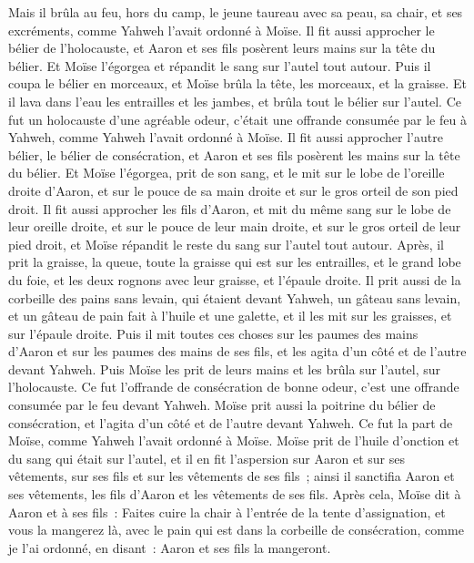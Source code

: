 \begin{multicols}{2}
Mais il brûla au feu, hors du camp, le jeune taureau avec sa peau, sa chair, et ses excréments, comme Yahweh l'avait ordonné à Moïse.
Il fit aussi approcher le bélier de l'holocauste, et Aaron et ses fils posèrent leurs mains sur la tête du bélier.
Et Moïse l'égorgea et répandit le sang sur l'autel tout autour.
Puis il coupa le bélier en morceaux, et Moïse brûla la tête, les morceaux, et la graisse.
Et il lava dans l'eau les entrailles et les jambes, et brûla tout le bélier sur l'autel. Ce fut un holocauste d'une agréable odeur, c'était une offrande consumée par le feu à Yahweh, comme Yahweh l'avait ordonné à Moïse.
Il fit aussi approcher l'autre bélier, le bélier de consécration, et Aaron et ses fils posèrent les mains sur la tête du bélier.
Et Moïse l'égorgea, prit de son sang, et le mit sur le lobe de l'oreille droite d'Aaron, et sur le pouce de sa main droite et sur le gros orteil de son pied droit.
Il fit aussi approcher les fils d'Aaron, et mit du même sang sur le lobe de leur oreille droite, et sur le pouce de leur main droite, et sur le gros orteil de leur pied droit, et Moïse répandit le reste du sang sur l'autel tout autour.
Après, il prit la graisse, la queue, toute la graisse qui est sur les entrailles, et le grand lobe du foie, et les deux rognons avec leur graisse, et l'épaule droite.
Il prit aussi de la corbeille des pains sans levain, qui étaient devant Yahweh, un gâteau sans levain, et un gâteau de pain fait à l'huile et une galette, et il les mit sur les graisses, et sur l'épaule droite.
Puis il mit toutes ces choses sur les paumes des mains d'Aaron et sur les paumes des mains de ses fils, et les agita d'un côté et de l'autre devant Yahweh.
Puis Moïse les prit de leurs mains et les brûla sur l'autel, sur l'holocauste. Ce fut l'offrande de consécration de bonne odeur, c'est une offrande consumée par le feu devant Yahweh.
Moïse prit aussi la poitrine du bélier de consécration, et l'agita d'un côté et de l'autre devant Yahweh. Ce fut la part de Moïse, comme Yahweh l'avait ordonné à Moïse.
Moïse prit de l'huile d'onction et du sang qui était sur l'autel, et il en fit l'aspersion sur Aaron et sur ses vêtements, sur ses fils et sur les vêtements de ses fils~; ainsi il sanctifia Aaron et ses vêtements, les fils d'Aaron et les vêtements de ses fils.
Après cela, Moïse dit à Aaron et à ses fils~: Faites cuire la chair à l'entrée de la tente d'assignation, et vous la mangerez là, avec le pain qui est dans la corbeille de consécration, comme je l'ai ordonné, en disant~: Aaron et ses fils la mangeront.

\end{multicols}
